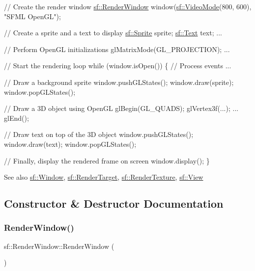 \begin{DoxyCode}
\textcolor{comment}{// Create the render window}
\hyperlink{classsf_1_1_render_window}{sf::RenderWindow} window(\hyperlink{classsf_1_1_video_mode}{sf::VideoMode}(800, 600), \textcolor{stringliteral}{"SFML OpenGL"});

\textcolor{comment}{// Create a sprite and a text to display}
\hyperlink{classsf_1_1_sprite}{sf::Sprite} sprite;
\hyperlink{classsf_1_1_text}{sf::Text} text;
...

\textcolor{comment}{// Perform OpenGL initializations}
glMatrixMode(GL\_PROJECTION);
...

\textcolor{comment}{// Start the rendering loop}
while (window.isOpen())
\{
    \textcolor{comment}{// Process events}
    ...

    \textcolor{comment}{// Draw a background sprite}
    window.pushGLStates();
    window.draw(sprite);
    window.popGLStates();

    \textcolor{comment}{// Draw a 3D object using OpenGL}
    glBegin(GL\_QUADS);
        glVertex3f(...);
        ...
    glEnd();

    \textcolor{comment}{// Draw text on top of the 3D object}
    window.pushGLStates();
    window.draw(text);
    window.popGLStates();

    \textcolor{comment}{// Finally, display the rendered frame on screen}
    window.display();
\}
\end{DoxyCode}


\begin{DoxySeeAlso}{See also}
\hyperlink{classsf_1_1_window}{sf\+::\+Window}, \hyperlink{classsf_1_1_render_target}{sf\+::\+Render\+Target}, \hyperlink{classsf_1_1_render_texture}{sf\+::\+Render\+Texture}, \hyperlink{classsf_1_1_view}{sf\+::\+View} 
\end{DoxySeeAlso}


\subsection{Constructor \& Destructor Documentation}
\mbox{\label{classsf_1_1_render_window_a839bbf336bdcafb084dafc3076fc9021}} 
\subsubsection{\texorpdfstring{Render\+Window()}{RenderWindow()}\hspace{0.1cm}{\footnotesize\ttfamily [1/3]}}
{\footnotesize\ttfamily sf\+::\+Render\+Window\+::\+Render\+Window (\begin{DoxyParamCaption}{ }\end{DoxyParamCaption})}



